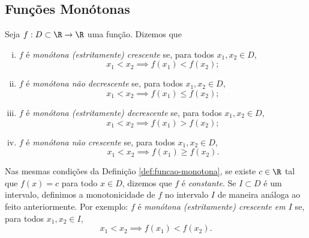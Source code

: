 \subsection{Funções Monótonas}

\begin{definition}
\label{def:funcao-monotona}
    Seja $f: D \subset \R \to \R$ uma função. Dizemos que
\begin{enumerate}[(i)]
  \item $f$ é \emph{monótona (estritamente) crescente} se, para todos $x_1, x_2 \in D$,
  $$x_1 < x_2 \implies f(x_1) < f(x_2);$$
  \item $f$ é \emph{monótona não decrescente} se, para todos $x_1, x_2 \in D$,
  $$x_1 < x_2 \implies f(x_1) \leq f(x_2);$$
  \item $f$ é \emph{monótona (estritamente) decrescente} se, para todos $x_1, x_2 \in D$,
  $$x_1 < x_2 \implies f(x_1) > f(x_2);$$
  \item $f$ é \emph{monótona não crescente} se, para todos $x_1, x_2 \in D$,
  $$x_1 < x_2 \implies f(x_1) \geq f(x_2).$$
\end{enumerate}
\end{definition}

Nas mesmas condições da Definição \ref{def:funcao-monotona}, se existe $c \in \R$ tal que $f(x) = c$ para todo $x \in D$, dizemos que $f$ é \emph{constante}.
Se $I \subset D$ é um intervalo, definimos a monotonicidade de $f$
no intervalo $I$ de maneira análoga ao feito anteriormente. Por
exemplo:
$f$ é \emph{monótona (estritamente) crescente em $I$} se, para todos
$x_1, x_2 \in I$,
  $$x_1 < x_2 \implies f(x_1) < f(x_2).$$
